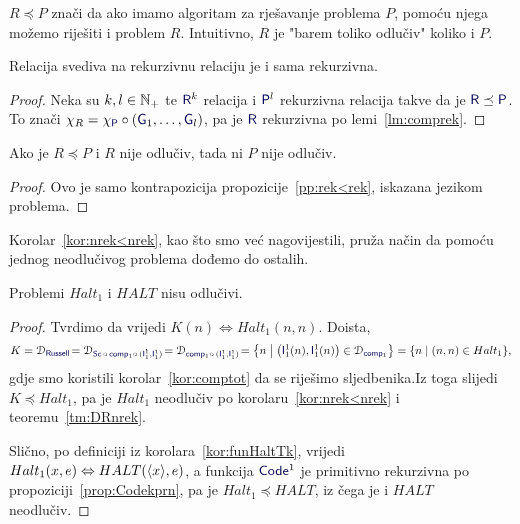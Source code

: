 $R\preceq P$ znači da ako imamo algoritam za rješavanje problema $P$, pomoću njega možemo riješiti i problem $R$. Intuitivno, $R$ je "barem toliko odlučiv" koliko i $P$.

\begin{propozicija}[{name=[svedivost čuva rekurzivnost]}]\label{pp:rek<rek}
Relacija svediva na rekurzivnu relaciju je i sama rekurzivna.
\end{propozicija}
\begin{proof}
Neka su $k,l\in{\mathbb N}_+$ te $\f R^k$ relacija i $\f P^l$ rekurzivna relacija takve da je $\f R\preceq\f P$. To znači $\chi_R=\chi_{\f P}\circ(\f G_1,\dotsc,\f G_l)$, pa je $\f R$ rekurzivna po lemi~\ref{lm:comprek}.
\end{proof}

\begin{korolar}[{name=[inverz svedivosti čuva neodlučivost]}]\label{kor:nrek<nrek}
Ako je $R\preceq P$ i $R$ nije odlučiv, tada ni $P$ nije odlučiv\!.
\end{korolar}
\begin{proof}
Ovo je samo kontrapozicija propozicije~\ref{pp:rek<rek}, iskazana jezikom problema.
\end{proof}


Korolar~\ref{kor:nrek<nrek}, kao što smo već nagovijestili, pruža način da pomoću jednog neodlučivog problema dođemo do ostalih.

\begin{propozicija}[{name=[neodlučivost problema zaustavljanja za RAM-strojeve]}]\label{pp:Haltnodl}
Problemi $Halt_1$ i $HALT$ nisu odlučivi.
\end{propozicija}
\begin{proof}
Tvrdimo da vrijedi $K(n)\Leftrightarrow Halt_1(n,n)$. Doista,
\begin{equation*}
    K=\dom{\f{Russell}}\!=\dom{\f{Sc}\,\circ\,\f{comp}_1\circ\,(\f I_1^1,\f I_1^1)}\!=\dom{\f{comp}_1\circ\,(\f I_1^1,\f I_1^1)}\!
    =\left\{n\;\middle\vert\;\bigl(\f I_1^1(n),\f I_1^1(n)\bigr)\in\dom{\f{comp}_1}\right\}
    =\{n\mid(n,n)\in Halt_1\}\text,
\end{equation*}
gdje smo koristili korolar~\ref{kor:comptot} da se riješimo sljedbenika.\newline Iz toga slijedi $K\preceq Halt_1$, pa je $Halt_1$ neodlučiv po korolaru~\ref{kor:nrek<nrek} i teoremu~\ref{tm:DRnrek}.

	Slično, po definiciji iz korolara~\ref{kor:funHaltTk}, vrijedi $Halt_1(x,e)\Leftrightarrow HALT(\langle x\rangle,e)$, a funkcija $\f{Code}^1$ je primitivno rekurzivna po propoziciji~\ref{prop:Codekprn}, pa je $Halt_1\!\preceq HALT$, iz čega je i $HALT$ neodlučiv\!.
\end{proof}

